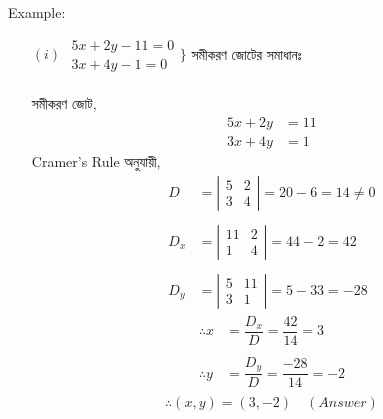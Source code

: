 \newpage
Example:
\begin{itemize}
	\item[$(i)$] $\begin{array}{r}
	5x+2y-11=0 \\
	3x+4y-1=0
	\end{array}\Bigg\}$ সমীকরণ জোটের সমাধানঃ\\ \\
	সমীকরণ জোট, 
	\begin{align}
	5x+2y &= 11 \tag{1} \\
	3x+4y &=1	\tag{2}
	\end{align}
	Cramer's Rule অনুযায়ী, 
	\begin{align*}
		D &=\left|\begin{array}{cc}
		5 & 2 \\
		3 & 4
		\end{array}\right|=20-6=14\neq 0 \\ \\
		D_x &=\left|\begin{array}{cc}
		11 & 2 \\
		1 & 4
		\end{array}\right|=44-2=42 \\ \\
		D_y &=\left|\begin{array}{cc}
		5 & 11 \\
		3 & 1
		\end{array}\right|=5-33=-28 
	\end{align*}
	\begin{align*}
		\therefore x &=\dfrac{D_x}{D}=\dfrac{42}{14}=3 \\ \\
		\therefore y &=\dfrac{D_y}{D}=\dfrac{-28}{14}=-2 \\ 
	\end{align*}
	\begin{equation*}
		\therefore (x,y)= (3,-2) \quad (Answer)
	\end{equation*}
	

\end{itemize}
